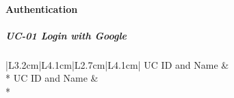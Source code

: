 \paragraph{Authentication}

\subparagraph{UC-01 Login with Google}

{\singlespacing
\setlength{\extrarowheight}{4pt}
\begin{longtable}{|L{3.2cm}|L{4.1cm}|L{2.7cm}|L{4.1cm}|}
\hline
{}UC ID and Name &  \\* \hline
\endfirsthead
\hline
{}UC ID and Name &  \\* \hline
\endhead
\hline\endfoot
\endlastfoot


\end{longtable}}
